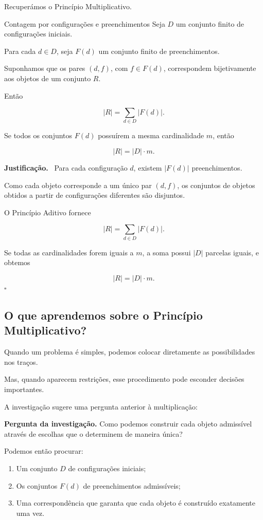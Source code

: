 \documentclass[11pt,a4paper,oneside]{book}
\newcommand{\Pergunta}[1]{\begin{perguntabox}\textbf{Pergunta da investigação.} #1\end{perguntabox}}
\newcommand{\prova}{\textbf{Justificação.}\ }
\newcommand{\fimprova}{\hfill$\square$}
\newcommand{\card}[1]{\lvert #1\rvert}
\begin{document}
Recuperámos o Princípio Multiplicativo.

\begin{teoremabox}{Contagem por configurações e preenchimentos}
Seja $D$ um conjunto finito
de configurações iniciais.

Para cada $d\in D$, seja $F(d)$
um conjunto finito de preenchimentos.

Suponhamos que os pares $(d,f)$,
com $f\in F(d)$, correspondem
bijetivamente aos objetos de
um conjunto $R$.

Então

\[
\boxed{
\card R=\sum_{d\in D}\card{F(d)}
}.
\]

Se todos os conjuntos $F(d)$
possuírem a mesma cardinalidade $m$, então

\[
\boxed{\card R=\card D\cdot m}.
\]

\prova
Para cada configuração $d$,
existem $\card{F(d)}$ preenchimentos.

Como cada objeto corresponde
a um único par $(d,f)$,
os conjuntos de objetos obtidos
a partir de configurações diferentes
são disjuntos.

O Princípio Aditivo fornece

\[
\card R=\sum_{d\in D}\card{F(d)}.
\]

Se todas as cardinalidades
forem iguais a $m$, a soma
possui $\card D$ parcelas iguais,
e obtemos

\[
\card R=\card D\cdot m.
\]
\fimprova
\end{teoremabox}

\subsection*{O que aprendemos sobre o Princípio Multiplicativo?}

Quando um problema é simples,
podemos colocar diretamente
as possibilidades nos traços.

Mas, quando aparecem restrições,
esse procedimento pode esconder
decisões importantes.

A investigação sugere
uma pergunta anterior à multiplicação:

\Pergunta{Como podemos construir cada objeto
admissível através de escolhas
que o determinem de maneira única?}

Podemos então procurar:

\begin{enumerate}
\item Um conjunto $D$ de configurações iniciais;

\item Os conjuntos $F(d)$
de preenchimentos admissíveis;

\item Uma correspondência que garanta
que cada objeto é construído
exatamente uma vez.
\end{enumerate}
\end{document}
